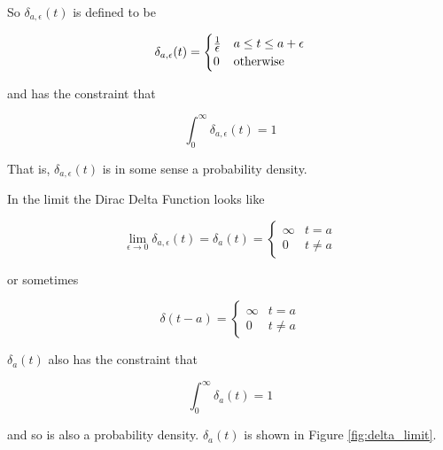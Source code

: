 \documentclass{article}
\theoremstyle{definition}
\begin{document}
\bigskip
\noindent
So $\delta_{a,\epsilon}(t)$ is defined to be

\begin{equation*}
\delta_{a,\epsilon}(t) =  
 \begin{cases} 
      \frac{1}{\mathlarger {\epsilon}} & a \leq t \leq a + \epsilon \\
      0                                               & \text{otherwise}
   \end{cases}
\label{eqn:delta}
\end{equation*}

\noindent
\bigskip
and has the constraint that


\begin{equation*}
  \int_{0}^{\infty} \delta_{a,\epsilon}(t) =  1
\end{equation*}

\bigskip
\bigskip
\noindent
\bigskip
That is, $\delta_{a,\epsilon}(t)$ is in some sense a probability density.

\bigskip
\noindent
In the limit the Dirac Delta Function looks like

\begin{equation*}
\lim_{\epsilon \to 0} \delta_{a,\epsilon}(t) =
\delta_{a}(t) =  
 \begin{cases} 
     \infty & t = a\\
      0     & t \neq a
   \end{cases}
\end{equation*}

\bigskip
\noindent
or sometimes

\begin{equation*}
\delta (t - a) =  
  \begin{cases} 
        \infty & t = a \\
        0       & t \neq a
  \end{cases}
\end{equation*}

\bigskip
\noindent
$\delta_a(t)$ also has the constraint that 


\begin{equation*}
  \int_{0}^{\infty} \delta_{a}(t) =  1
\end{equation*}

\bigskip
\noindent
and so is also a probability density. $\delta_a(t)$  is shown in
Figure \ref{fig:delta_limit}. 
\end{document}
